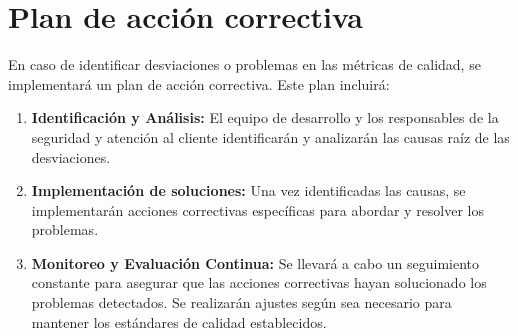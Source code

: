 \documentclass[12pt,a4paper]{article}
\begin{document}
\section{Plan de acción correctiva}

En caso de identificar desviaciones o problemas en las métricas de calidad, se implementará
un plan de acción correctiva. Este plan incluirá:

\begin{enumerate}
  \item \textbf{Identificación y Análisis:}
        El equipo de desarrollo y los responsables de la seguridad y atención al cliente
        identificarán y analizarán las causas raíz de las desviaciones.

  \item \textbf{Implementación de soluciones:}
        Una vez identificadas las causas, se implementarán acciones correctivas específicas
        para abordar y resolver los problemas.

  \item \textbf{Monitoreo y Evaluación Continua:}
        Se llevará a cabo un seguimiento constante para asegurar que las acciones correctivas
        hayan solucionado los problemas detectados. Se realizarán ajustes según sea necesario
        para mantener los estándares de calidad establecidos.
\end{enumerate}
\end{document}
